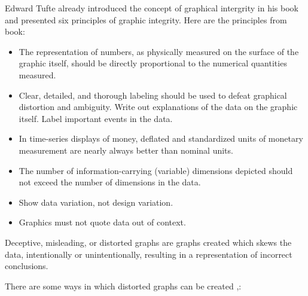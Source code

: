 \documentclass[]{book}
\providecommand{\tightlist}{%
  \setlength{\itemsep}{0pt}\setlength{\parskip}{0pt}}
\theoremstyle{definition}
\theoremstyle{definition}
\theoremstyle{definition}
\theoremstyle{remark}
\begin{document}
Edward Tufte already introduced the concept of graphical intergrity in
his book and presented six principles of graphic integrity. Here are the
principles from book:

\begin{itemize}
\tightlist
\item
  The representation of numbers, as physically measured on the surface
  of the graphic itself, should be directly proportional to the
  numerical quantities measured.
\item
  Clear, detailed, and thorough labeling should be used to defeat
  graphical distortion and ambiguity. Write out explanations of the data
  on the graphic itself. Label important events in the data.
\item
  In time-series displays of money, deﬂated and standardized units of
  monetary measurement are nearly always better than nominal units.
\item
  The number of information-carrying (variable) dimensions depicted
  should not exceed the number of dimensions in the data.
\item
  Show data variation, not design variation.
\item
  Graphics must not quote data out of context.
\end{itemize}

Deceptive, misleading, or distorted graphs are graphs created which
skews the data, intentionally or unintentionally, resulting in a
representation of incorrect conclusions.

There are some ways in which distorted graphs can be created
\citep{evil_axes},\citep{mislead_graph_ex}:
\end{document}
